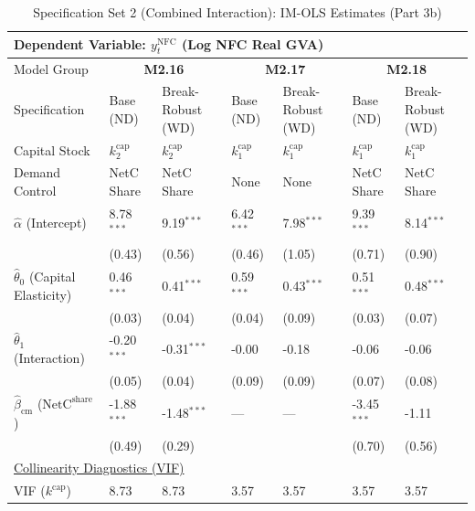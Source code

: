\begin{table}[H]
\centering
\caption{Specification Set 2 (Combined Interaction): IM-OLS Estimates (Part 3b)}
\label{tab:spec_set_2_p3b}
\scriptsize
\begin{tabular}{p{3.8cm}p{2.1cm}p{2.1cm}p{2.1cm}p{2.1cm}p{2.1cm}p{2.1cm}}
\toprule
\multicolumn{7}{l}{\textbf{Dependent Variable: $y_t^{\text{NFC}}$ (Log NFC Real GVA)}} \\
\midrule
Model Group & \multicolumn{2}{c}{\textbf{M2.16}} & \multicolumn{2}{c}{\textbf{M2.17}} & \multicolumn{2}{c}{\textbf{M2.18}}  \\
Specification & Base (ND) & Break-Robust (WD) & Base (ND) & Break-Robust (WD) & Base (ND) & Break-Robust (WD)  \\
Capital Stock & $k^{\text{cap}}_2$ & $k^{\text{cap}}_2$ & $k^{\text{cap}}_1$ & $k^{\text{cap}}_1$ & $k^{\text{cap}}_1$ & $k^{\text{cap}}_1$  \\
Demand Control & NetC Share & NetC Share & None & None & NetC Share & NetC Share  \\
\midrule
$\hat{\alpha}$ (Intercept)  & 8.78$^{***}$ & 9.19$^{***}$ & 6.42$^{***}$ & 7.98$^{***}$ & 9.39$^{***}$ & 8.14$^{***}$  \\
 & {\scriptsize (0.43)} & {\scriptsize (0.56)} & {\scriptsize (0.46)} & {\scriptsize (1.05)} & {\scriptsize (0.71)} & {\scriptsize (0.90)}  \\
[1ex]
$\hat{\theta}_0$ (Capital Elasticity)  & 0.46$^{***}$ & 0.41$^{***}$ & 0.59$^{***}$ & 0.43$^{***}$ & 0.51$^{***}$ & 0.48$^{***}$  \\
 & {\scriptsize (0.03)} & {\scriptsize (0.04)} & {\scriptsize (0.04)} & {\scriptsize (0.09)} & {\scriptsize (0.03)} & {\scriptsize (0.07)}  \\
$\hat{\theta}_1$ (Interaction)  & -0.20$^{***}$ & -0.31$^{***}$ & -0.00 & -0.18 & -0.06 & -0.06  \\
 & {\scriptsize (0.05)} & {\scriptsize (0.04)} & {\scriptsize (0.09)} & {\scriptsize (0.09)} & {\scriptsize (0.07)} & {\scriptsize (0.08)}  \\
$\hat{\beta}_{\text{cm}}$ ($\text{NetC}^{\text{share}}$)  & -1.88$^{***}$ & -1.48$^{***}$ & --- & --- & -3.45$^{***}$ & -1.11  \\
 & {\scriptsize (0.49)} & {\scriptsize (0.29)} &  &  & {\scriptsize (0.70)} & {\scriptsize (0.56)}  \\
\midrule
\multicolumn{7}{l}{\underline{Collinearity Diagnostics (VIF)}} \\
VIF ($k^{\text{cap}}$) & 8.73 & 8.73 & 3.57 & 3.57 & 3.57 & 3.57  \\

\end{tabular}
\end{table}
